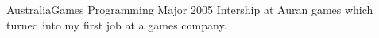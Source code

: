 %
%
%


\begin{scholarship}
					{Australia}{Games Programming Major}
					{2005} {Intership at Auran games which turned into my first job at a games company.}

					
\end{scholarship}
